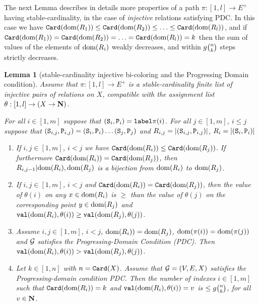 \documentclass{lmcs}
\newtheorem{lemma}[theorem]{Lemma}
\begin{document}
The next Lemma describes in details more properties of a path
$\pi:[1,l] \rightarrow E^+$ having stable-cardinality, in the case of \emph{injective}
relations satisfying PDC. 
In this case we have ${\tt Card}({\rm dom}(R_{1})) \le {\tt Card}({\rm dom}(R_{2})) \le \ldots \le 
{\tt Card}({\rm dom}(R_{l}))$, and if ${\tt Card}({\rm dom}(R_{1})) = {\tt Card}({\rm dom}(R_{2})) = \ldots = 
{\tt Card}({\rm dom}(R_{l}))=k$ then 
the sum of values of the elements of ${\rm dom}(R_i)$ weakly decreases,
and within $g\newton{n}{k}$ steps strictly decreases.

\begin{lemma}
[stable-cardinality injective bi-coloring and the Progressing Domain condition]
\label{lemma-stable-cardinality-injective}
Assume that 
$\pi:[1,l] \rightarrow E^+$ 
is a \emph{stable-cardinality} finite list
of \emph{injective} pairs of relations on $X$, 
compatible with the assignment list 
$\theta:[1,l] \rightarrow (X \rightarrow {\bf N})$.

For all $i \in[1,m]$ suppose that $({\tt S}_i,{\tt P}_i) = {\tt label}\pi(i)$.
For all $j \in[1,m]$, $i \le j$
suppose that $({\tt S}_{i,j},{\tt P}_{i,j}) = ({\tt S}_i,{\tt P}_i) \ldots ({\tt S}_j,{\tt P}_j)$
and $R_{i,j} = {| ({\tt S}_{i,j},{\tt P}_{i,j}) |}$, 
$R_i = {| ({\tt S}_{i},{\tt P}_{i}) |}$

\begin{enumerate}
\item
\label{lemma-stable-cardinality-injective-01}
If $i,j \in[1,m]$, $i < j$ we have ${\tt Card}({\rm dom}(R_i)) \le {\tt Card}({\rm dom}(R_j))$.
If furthermore ${\tt Card}({\rm dom}(R_i)) = {\tt Card}({\rm dom}(R_j))$,
then $R_{i,j-1} {|} {\rm dom}(R_{i}), {\rm dom}(R_{j})$ is a bijection from ${\rm dom}(R_{i})$
to ${\rm dom}(R_{j})$.

\item
\label{lemma-stable-cardinality-injective-02}
If $i,j \in[1,m]$, $i < j$ and ${\tt Card}({\rm dom}(R_i)) = {\tt Card}({\rm dom}(R_j))$, then 
the value of $\theta(i)$ on any $x \in {\rm dom}(R_i)$ is $\ge$ than the value of
$\theta(j)$ on the corresponding point $y \in {\rm dom}(R_j)$ and
${\tt val}({\rm dom}(R_i),\theta(i)) \ge {\tt val}({\rm dom}(R_j),\theta(j))$.

\item
\label{lemma-stable-cardinality-injective-03}
Assume $i,j \in[1,m]$, $i < j$, ${\rm dom}(R_i)) ={\rm dom}(R_j)$, 
${\rm dom}(\pi(i)) = {\rm dom}(\pi(j)) $ 
and ${\mathcal G}$ satisfies the Progressing-Domain Condition (PDC). Then 
${\tt val}({\rm dom}(R_i),\theta(i)) > {\tt val}({\rm dom}(R_j),\theta(j))$.

\item
\label{lemma-stable-cardinality-injective-04}
Let $k \in [1,n]$
with $n = {\tt Card}(X)$.
Assume that ${\mathcal G}=(V,E,X)$
satisfies the Progressing-domain condition PDC.
Then the number of indexes $i \in[1,m]$ such that ${\tt Card}({\rm dom}(R_i))=k$
and ${\tt val}({\rm dom}(R_i),\theta(i))=v$ is
$\le g\newton{n}{k}$, for all $v \in {\bf N}$.

\end{enumerate}
\end{lemma}
\end{document}
